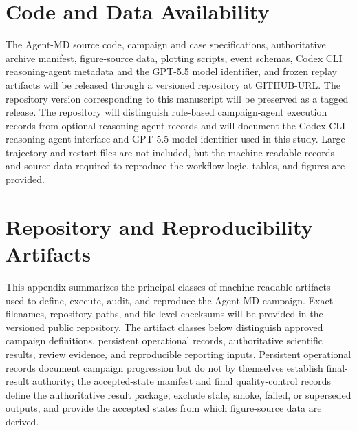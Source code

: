 
\section*{Code and Data Availability}

The Agent-MD source code, campaign and case specifications, authoritative archive manifest, figure-source data, plotting scripts, event schemas, Codex CLI reasoning-agent metadata and the GPT-5.5 model identifier, and frozen replay artifacts will be released through a versioned repository at \url{GITHUB-URL}. The repository version corresponding to this manuscript will be preserved as a tagged release. The repository will distinguish rule-based campaign-agent execution records from optional reasoning-agent records and will document the Codex CLI reasoning-agent interface and GPT-5.5 model identifier used in this study. Large trajectory and restart files are not included, but the machine-readable records and source data required to reproduce the workflow logic, tables, and figures are provided.

\appendix
\section{Repository and Reproducibility Artifacts}
\label{app:repo_artifacts}

This appendix summarizes the principal classes of machine-readable artifacts used to define, execute, audit, and reproduce the Agent-MD campaign. Exact filenames, repository paths, and file-level checksums will be provided in the versioned public repository. The artifact classes below distinguish approved campaign definitions, persistent operational records, authoritative scientific results, review evidence, and reproducible reporting inputs. Persistent operational records document campaign progression but do not by themselves establish final-result authority; the accepted-state manifest and final quality-control records define the authoritative result package, exclude stale, smoke, failed, or superseded outputs, and provide the accepted states from which figure-source data are derived.

